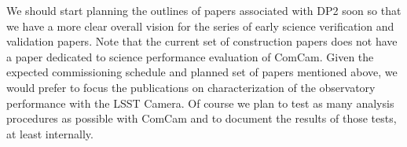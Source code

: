 {\begin{itemize}
\end{itemize}

We should start planning the outlines of papers associated with DP2 soon so that we have a more clear overall vision for the series of early science verification and validation papers.
Note that the current set of construction papers does not have a paper dedicated to science performance evaluation of ComCam.
Given the expected commissioning schedule and planned set of papers mentioned above, we would prefer to focus the publications on characterization of the observatory performance with the LSST Camera.
Of course we plan to test as many analysis procedures as possible with ComCam and to document the results of those tests, at least internally.

}





